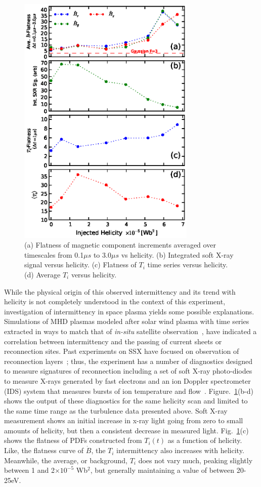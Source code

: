 \documentclass[aps,prl,amsmath,amssymb,reprint,superscriptaddress]{revtex4-1} %
\begin{document}
\begin{figure}[!htbp]
\centerline{
\includegraphics[width=8.5cm]{figure4.eps}}
\caption{\label{fig:flatness_scaling} (a) Flatness of magnetic component increments averaged over timescales from 0.1$\mu s$ to 3.0$\mu s$ vs helicity. (b) Integrated soft X-ray signal versus helicity. (c) Flatness of $T_{i}$ time series versus helicity. (d) Average $T_{i}$ versus helicity.}
\end{figure}

While the physical origin of this observed intermittency and its trend with helicity is not completely understood in the context of this experiment, investigation of intermittency in space plasma yields some possible explanations. Simulations of MHD plasmas modeled after solar wind plasma with time series extracted in ways to match that of \textit{in-situ} satellite observation~\cite{Greco08,Greco09}, have indicated a correlation between intermittency and the passing of current sheets or reconnection sites. Past experiments on SSX have focused on observation of reconnection layers~\cite{Gray10,brown12}; thus, the experiment has a number of diagnostics designed to measure signatures of reconnection including a set of soft X-ray photo-diodes~\cite{chaplin09} to measure X-rays generated by fast electrons and an ion Doppler spectrometer (IDS) system that measures bursts of ion temperature and flow~\cite{brown12}. Figure.~\ref{fig:flatness_scaling}(b-d) shows the output of these diagnostics for the same helicity scan and limited to the same time range as the turbulence data presented above. Soft X-ray measurement shows an initial increase in x-ray light going from zero to small amounts of helicity, but then a consistent decrease in measured light. Fig.~\ref{fig:flatness_scaling}(c) shows the flatness of PDFs constructed from $T_{i}(t)$ as a function of helicity. Like, the flatness curve of $\dot{B}$, the $T_{i}$ intermittency also increases with helicity. Meanwhile, the average, or background, $T_{i}$ does not vary much, peaking slightly between 1 and 2$\times 10^{-5}$ Wb$^{2}$, but generally maintaining a value of between 20-25eV. 
\end{document}
